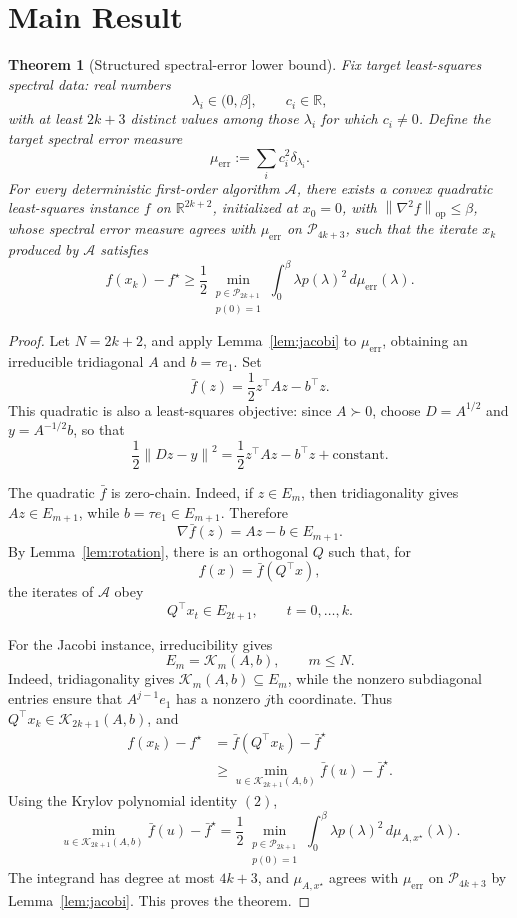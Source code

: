 \documentclass[11pt]{article}
\newtheorem{theorem}{Theorem}[section]
\theoremstyle{definition}
\newcommand{\R}{\mathbb{R}}
\newcommand{\K}{\mathcal{K}}
\newcommand{\Pcal}{\mathcal{P}}
\newcommand{\norm}[1]{\left\lVert #1\right\rVert}
\newcommand{\op}{\mathrm{op}}
\begin{document}
\section{Main Result}

\begin{theorem}[Structured spectral-error lower bound]
\label{thm:main}
Fix target least-squares spectral data: real numbers
\[
  \lambda_i\in(0,\beta],
  \qquad c_i\in\R,
\]
with at least \(2k+3\) distinct values among those \(\lambda_i\) for which
\(c_i\ne 0\).  Define the target spectral error measure
\[
  \mu_{\mathrm{err}}:=\sum_i c_i^2\delta_{\lambda_i}.
\]
For every deterministic first-order algorithm \(\mathcal A\), there exists a
convex quadratic least-squares instance \(f\) on \(\R^{2k+2}\), initialized at
\(x_0=0\), with \(\norm{\nabla^2 f}_{\op}\le\beta\), whose spectral error
measure agrees with \(\mu_{\mathrm{err}}\) on \(\Pcal_{4k+3}\), such that the
iterate \(x_k\) produced by \(\mathcal A\) satisfies
\[
  f(x_k)-f^\star
  \ge
  \frac12
  \min_{\substack{p\in\Pcal_{2k+1}\\p(0)=1}}
  \int_0^\beta \lambda p(\lambda)^2\,d\mu_{\mathrm{err}}(\lambda).
\]
\end{theorem}

\begin{proof}
Let \(N=2k+2\), and apply Lemma~\ref{lem:jacobi} to
\(\mu_{\mathrm{err}}\), obtaining an irreducible tridiagonal \(A\) and
\(b=\tau e_1\).  Set
\[
  \bar f(z)=\frac12 z^\top A z-b^\top z.
\]
This quadratic is also a least-squares objective: since \(A\succ 0\), choose
\(D=A^{1/2}\) and \(y=A^{-1/2}b\), so that
\[
  \frac12\norm{Dz-y}^2
  =
  \frac12 z^\top A z-b^\top z+\text{constant}.
\]

The quadratic \(\bar f\) is zero-chain.  Indeed, if \(z\in E_m\), then
tridiagonality gives \(Az\in E_{m+1}\), while \(b=\tau e_1\in E_{m+1}\).
Therefore
\[
  \nabla\bar f(z)=Az-b\in E_{m+1}.
\]
By Lemma~\ref{lem:rotation}, there is an orthogonal \(Q\) such that, for
\[
  f(x)=\bar f(Q^\top x),
\]
the iterates of \(\mathcal A\) obey
\[
  Q^\top x_t\in E_{2t+1},\qquad t=0,\ldots,k.
\]

For the Jacobi instance, irreducibility gives
\[
  E_m=\K_m(A,b),\qquad m\le N.
\]
Indeed, tridiagonality gives \(\K_m(A,b)\subseteq E_m\), while the nonzero
subdiagonal entries ensure that \(A^{j-1}e_1\) has a nonzero \(j\)th
coordinate.  Thus \(Q^\top x_k\in\K_{2k+1}(A,b)\), and
\[
\begin{aligned}
  f(x_k)-f^\star
  &=
  \bar f(Q^\top x_k)-\bar f^\star  \\
  &\ge
  \min_{u\in\K_{2k+1}(A,b)} \bar f(u)-\bar f^\star.
\end{aligned}
\]
Using the Krylov polynomial identity \((2)\),
\[
  \min_{u\in\K_{2k+1}(A,b)} \bar f(u)-\bar f^\star
  =
  \frac12
  \min_{\substack{p\in\Pcal_{2k+1}\\p(0)=1}}
  \int_0^\beta \lambda p(\lambda)^2\,d\mu_{A,x^\star}(\lambda).
\]
The integrand has degree at most \(4k+3\), and
\(\mu_{A,x^\star}\) agrees with \(\mu_{\mathrm{err}}\) on
\(\Pcal_{4k+3}\) by Lemma~\ref{lem:jacobi}.  This proves the theorem.
\end{proof}
\end{document}
